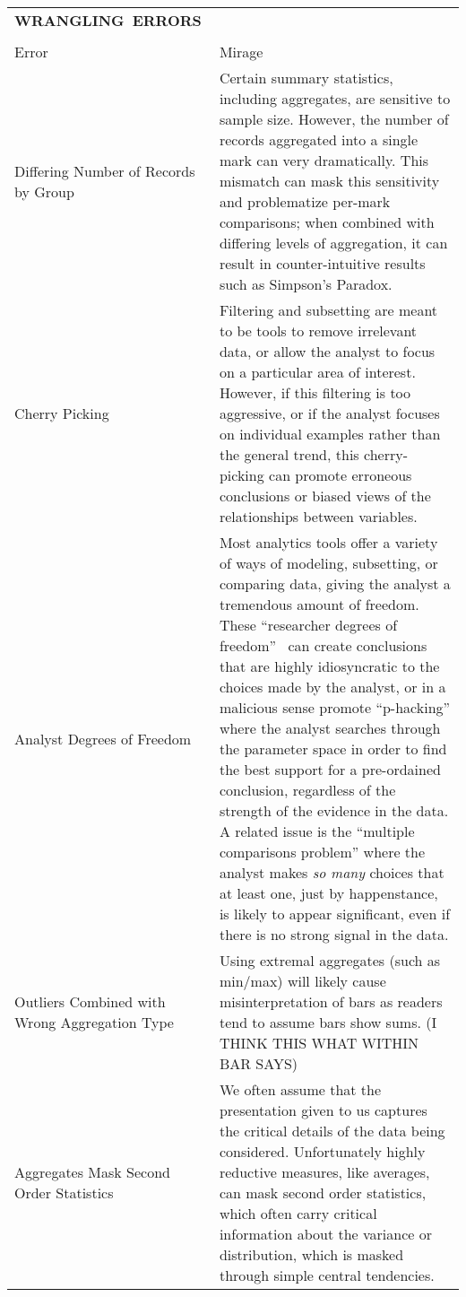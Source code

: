 \begin{longtable}{p{3cm}p{14cm}}
  \\\hbox{\normalsize{\textbf{WRANGLING ERRORS}}}&\\ \\
  \normalsize{Error} & \normalsize{Mirage}\\ \hline
   \rowcolor{colorb}Differing Number \newline of Records by \newline Group  & Certain summary statistics, including aggregates, are sensitive to sample size. However, the number of records aggregated into a single mark can very dramatically. This mismatch can mask this sensitivity and problematize per-mark comparisons; when combined with differing levels of aggregation, it can result in counter-intuitive results such as Simpson's Paradox. \cite{guo2017you}\\
 \rowcolor{colorb-opaque}Cherry Picking & Filtering and subsetting are meant to be tools to remove irrelevant data, or allow the analyst to focus on a particular area of interest. However, if this filtering is too aggressive, or if the analyst focuses on individual examples rather than the general trend, this cherry-picking can promote erroneous conclusions or biased views of the relationships between variables. \cite{few2019loom}\\
 \rowcolor{colorb}Analyst Degrees of Freedom & Most analytics tools offer a variety of ways of modeling, subsetting, or comparing data, giving the analyst a tremendous amount of freedom. These ``researcher degrees of freedom''~\cite{gelman2013garden} can create conclusions that are highly idiosyncratic to the choices made by the analyst, or in a malicious sense promote ``p-hacking'' where the analyst searches through the parameter space in order to find the best support for a pre-ordained conclusion, regardless of the strength of the evidence in the data. A related issue is the ``multiple comparisons problem'' where the analyst makes \emph{so many} choices that at least one, just by happenstance, is likely to appear significant, even if there is no strong signal in the data. \cite{gelman2013garden,pu2018garden,zgraggen2018investigating}\\
 \rowcolor{colorb-opaque}Outliers Combined with Wrong Aggregation Type & Using extremal aggregates (such as min/max) will likely cause misinterpretation of bars as readers tend to assume bars show sums. (I THINK THIS WHAT WITHIN BAR SAYS) \cite{newman2012bar}\\
 \rowcolor{colorb}Aggregates Mask Second Order Statistics  & We often assume that the presentation given to us captures the critical details of the data being considered. Unfortunately highly reductive measures, like averages, can mask second order statistics, which often carry critical information about the variance or distribution, which is masked through simple central tendencies.  \cite{wall2017warning, few2019loom, matejka2017same, anscombe1973graphs, salimi2018bias}\\

\end{longtable}
